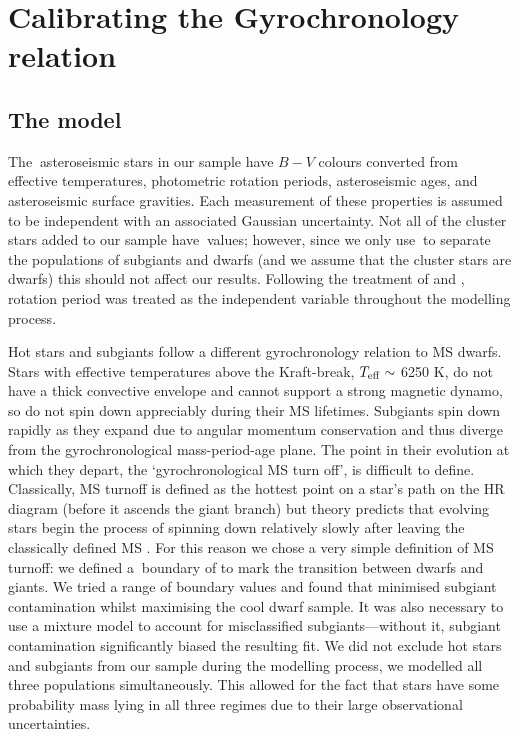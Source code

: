 \section{Calibrating the Gyrochronology relation}
\label{sec:gyro_cal}

\subsection{The model}

The \nastero$~$asteroseismic stars in our sample have $B-V$ colours converted
from effective temperatures, photometric rotation periods,
asteroseismic ages, and asteroseismic surface gravities.
Each measurement of these properties is assumed to be independent with an
associated Gaussian uncertainty.
Not all of the cluster stars added to our sample have \logg$~$values; however,
since we only use \logg$~$to separate the populations of subgiants and dwarfs
(and we assume that the cluster stars are dwarfs) this should not affect our
results.
Following the treatment of \citet{Barnes2007} and \citet{Mamajek2008},
rotation period was treated as the independent variable throughout the
modelling process.

Hot stars and subgiants follow a different gyrochronology relation to MS
dwarfs.
Stars with effective temperatures above the Kraft-break, $T_{\rm{eff}}
\sim$ 6250 K, \citep{Kraft1967} do not have a thick convective envelope and
cannot support a strong magnetic dynamo, so do not spin down appreciably
during their MS lifetimes.
Subgiants spin down rapidly as they expand due to angular momentum
conservation and thus diverge from the gyrochronological mass-period-age
plane.
The point in their evolution at which they depart, the `gyrochronological MS
turn off', is difficult to define.
Classically, MS turnoff is defined as the hottest point on a star's path on
the HR diagram (before it ascends the giant branch) but theory predicts that
evolving stars begin the process of spinning down relatively slowly after
leaving the classically defined MS \citep{Vansaders2013}.
For this reason we chose a very simple definition of MS turnoff: we defined
a \logg$~$boundary of \subcut to mark the transition between dwarfs and
giants.
We tried a range of boundary values and found that \subcut minimised subgiant
contamination whilst maximising the cool dwarf sample.  %
It was also necessary to use a mixture model to account for misclassified
subgiants---without it, subgiant contamination significantly biased the
resulting fit.
We did not exclude hot stars and subgiants from our sample during the
modelling process, we modelled all three populations simultaneously.
This allowed for the fact that stars have some probability mass lying in all
three regimes due to their large observational uncertainties.

